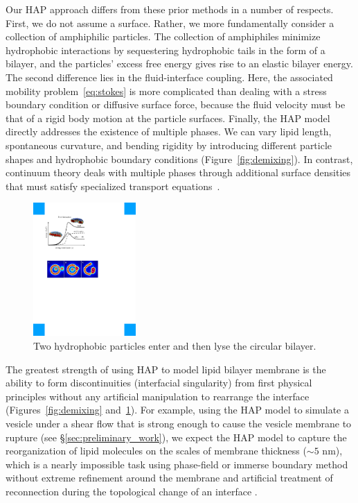 Our HAP approach differs from these prior methods in a number of
respects. First, we do not assume a surface. Rather, we more
fundamentally consider a collection of amphiphilic particles. The
collection of amphiphiles minimize hydrophobic interactions by
sequestering hydrophobic tails in the form of a bilayer, and the
particles' excess free energy gives rise to an elastic bilayer energy.
The second difference lies in the fluid-interface coupling. Here, the
associated mobility problem~\eqref{eq:stokes} is more complicated than
dealing with a stress boundary condition or diffusive surface force,
because the fluid velocity must be that of a rigid body motion at the
particle surfaces. Finally, the HAP model directly addresses the
existence of multiple phases. We can vary lipid length, spontaneous
curvature, and bending rigidity by introducing different particle shapes
and hydrophobic boundary conditions (Figure~\ref{fig:demixing}). In
contrast, continuum theory deals with multiple phases through additional
surface densities that must satisfy specialized transport
equations~\cite{Lowengrub07, MikuckiZhou17}. 


\begin{figure}
\centerline{\includegraphics[width=0.35\textwidth]{figures/Lysis.pdf}}
  \vspace{-8pt}
  \caption{\label{fig:lysis} \footnotesize Two hydrophobic particles
  enter and then lyse the circular bilayer.}
\end{figure}
The greatest strength of using HAP to model lipid bilayer membrane is
the ability to form discontinuities (interfacial singularity) from first
physical principles without any artificial manipulation to rearrange the
interface (Figures~\ref{fig:demixing} and~\ref{fig:lysis}). For
example, using the HAP model to simulate a vesicle under a shear flow
that is strong enough to cause the vesicle membrane to rupture (see
\S\ref{sec:preliminary_work}), we expect the HAP model to capture the
reorganization of lipid molecules on the scales of membrane thickness
($\sim 5$ nm), which is a nearly impossible task using phase-field or
immerse boundary method without extreme refinement around the membrane
and artificial treatment of reconnection during the topological change
of an interface \cite{doi:10.1063/5.0009734, LiAn-Chang16,
doi:10.1098/rspa.2012.0505, doi:10.1137/130941432, Feetzl18,
doi:10.1137/16M1108406}.


